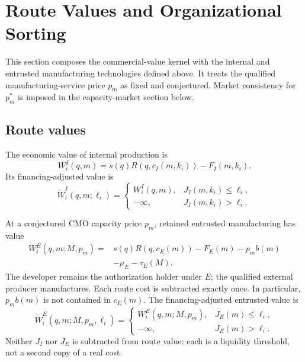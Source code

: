 \section{Route Values and Organizational Sorting}
\label{sec:p04-route-sorting}

This section composes the commercial-value kernel with the internal and
entrusted manufacturing technologies defined above. It treats the qualified
manufacturing-service price \(p_m\) as fixed and conjectured. Market
consistency for \(p_m^*\) is imposed in the capacity-market section below.

\subsection{Route values}
\label{subsec:p04-route-values}

The economic value of internal production is
\begin{equation}
  W_i^I(q,m)
  =
  s(q)R\!\left(q,c_I(m,k_i)\right)
  -
  F_I(m,k_i).
  \label{eq:p04-internal-value}
\end{equation}
Its financing-adjusted value is
\begin{equation}
  \widetilde W_i^I(q,m;\ell_i)
  =
  \begin{cases}
    W_i^I(q,m), & J_I(m,k_i)\leq\ell_i,\\
    -\infty, & J_I(m,k_i)>\ell_i.
  \end{cases}
  \label{eq:p04-finance-adjusted-internal}
\end{equation}

At a conjectured CMO capacity price \(p_m\), retained entrusted manufacturing
has value
\begin{equation}
  \begin{aligned}
  W_i^E(q,m;M,p_m)
  ={}&
  s(q)R\!\left(q,c_E(m)\right)
  -F_E(m)-p_m b(m)\\
  &-\mu_E-\tau_E(M).
  \end{aligned}
  \label{eq:p04-entrusted-value}
\end{equation}
The developer remains the authorization holder under \(E\); the qualified
external producer manufactures. Each route cost is subtracted exactly once.
In particular, \(p_m b(m)\) is not contained in \(c_E(m)\).
The financing-adjusted entrusted value is
\begin{equation}
  \widetilde W_i^E(q,m;M,p_m,\ell_i)
  =
  \begin{cases}
    W_i^E(q,m;M,p_m), & J_E(m)\leq\ell_i,\\
    -\infty, & J_E(m)>\ell_i.
  \end{cases}
  \label{eq:p04-finance-adjusted-entrusted}
\end{equation}
Neither \(J_I\) nor \(J_E\) is subtracted from route value: each is a
liquidity threshold, not a second copy of a real cost.

